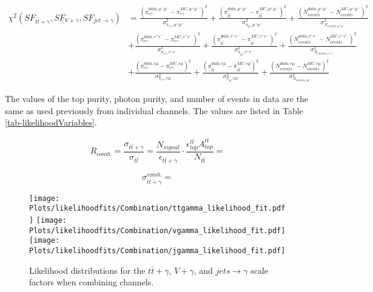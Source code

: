 \begin{equation}
\begin{split}
\chi^2(SF_{t\bar{t}+\gamma},SF_{V+\gamma},SF_{jet\to\gamma}) & = \frac{\left(\pi^{data,\mu^+\mu^-}_{e\gamma} - \pi^{MC,\mu^+\mu^-}_{e\gamma}\right)^2}{\sigma^2_{\pi_{e\gamma},\mu^+\mu^-}} + \frac{\left(\pi^{data,\mu^+\mu^-}_{t\bar{t}} - \pi^{MC,\mu^+\mu^-}_{t\bar{t}}\right)^2}{\sigma^2_{\pi_{t\bar{t}},\mu^+\mu^-}} + \frac{\left(N^{data,\mu^+\mu^-}_{events} - N^{MC,\mu^+\mu^-}_{events}\right)^2}{\sigma^2_{N_{events,\mu^+\mu^-}}} \\
& + \frac{\left(\pi^{data,e^+e^-}_{e\gamma} - \pi^{MC,e^+e^-}_{e\gamma}\right)^2}{\sigma^2_{\pi_{e\gamma},e^+e^-}} + \frac{\left(\pi^{data,e^+e^-}_{t\bar{t}} - \pi^{MC,e^+e^-}_{t\bar{t}}\right)^2}{\sigma^2_{\pi_{t\bar{t}},e^+e^-}} + \frac{\left(N^{data,e^+e^-}_{events} - N^{MC,e^+e^-}_{events}\right)^2}{\sigma^2_{N_{events,e^+e^-}}} \\
& + \frac{\left(\pi^{data,e\mu}_{e\gamma} - \pi^{MC,e\mu}_{e\gamma}\right)^2}{\sigma^2_{\pi_{e\gamma},e\mu}} + \frac{\left(\pi^{data,e\mu}_{t\bar{t}} - \pi^{MC,e\mu}_{t\bar{t}}\right)^2}{\sigma^2_{\pi_{t\bar{t}},e\mu}} + \frac{\left(N^{data,e\mu}_{events} - N^{MC,e\mu}_{events}\right)^2}{\sigma^2_{N_{events,e\mu}}} 
\end{split}
\end{equation}

The values of the top purity, photon purity, and number of events in data are the same as used previously from individual channels. The values are listed in Table \ref{tab-likelihoodVariables}.  

\begin{equation}
	R_{comb.} = \frac{\sigma_{t\bar{t}+\gamma}}{\sigma_{t\bar{t}}} = \frac{N_{signal}}{\epsilon_{t\bar{t}+\gamma}} \cdot \frac{\epsilon^{t\bar{t}}_{top} A^{t\bar{t}}_{top}}{N_{t\bar{t}}} = 
\end{equation}

\begin{equation}
	\sigma_{t\bar{t}+\gamma}^{comb.} = 
\end{equation}

\begin{figure}
\texttt{[image: Plots/likelihoodfits/Combination/ttgamma\_likelihood\_fit.pdf]}
\texttt{[image: Plots/likelihoodfits/Combination/vgamma\_likelihood\_fit.pdf]}
\texttt{[image: Plots/likelihoodfits/Combination/jgamma\_likelihood\_fit.pdf]}
\caption{Likelihood distributions for the $t\bar{t}+\gamma$, $V+\gamma$, and $jets\to \gamma$ scale factors when combining channels.}
\label{fig-SFLikelihoodFitsCombination}
\end{figure}
